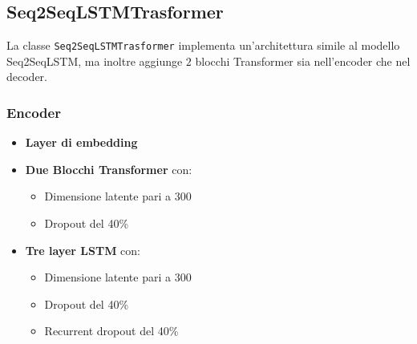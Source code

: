 \subsection{Seq2SeqLSTMTrasformer}
La classe \texttt{Seq2SeqLSTMTrasformer} implementa un'architettura simile al modello Seq2SeqLSTM, ma inoltre aggiunge \(2\) blocchi Transformer sia nell'encoder che nel decoder.\\

\subsubsection{Encoder}
\begin{itemize}
    \item \textbf{Layer di embedding}
    \item \textbf{Due Blocchi Transformer} con:
        \begin{itemize}
            \item Dimensione latente pari a 300
            \item Dropout del 40\%
        \end{itemize}
    \item \textbf{Tre layer LSTM} con:
    \begin{itemize}
        \item Dimensione latente pari a 300
        \item Dropout del 40\%
        \item Recurrent dropout del 40\%
    \end{itemize}
\end{itemize}

